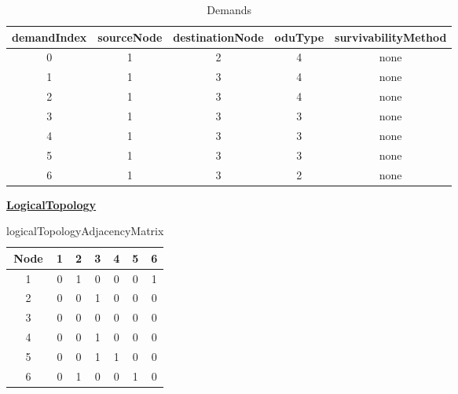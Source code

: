 \begin{table}[H]
	\centering
	\begin{tabular}{| c | c | c | c | c |}
		\hline
		\textbf{demandIndex} & \textbf{sourceNode} & \textbf{destinationNode} & \textbf{oduType} & \textbf{survivabilityMethod}\\ \hline
		0                    & 1                   & 2                        & 4                & none						   \\ \hline
		1                    & 1                   & 3                        & 4                & none                        \\ \hline
		2                    & 1                   & 3                        & 4                & none                        \\ \hline
		3                    & 1                   & 3                        & 3                & none                        \\ \hline
		4                    & 1                   & 3                        & 3                & none                        \\ \hline
		5                    & 1                   & 3                        & 3                & none                        \\ \hline
		6                    & 1                   & 3                        & 2                & none                        \\ \hline
	\end{tabular}
	\caption{Demands}
	\label{demands}
\end{table}

\underline{\textbf{LogicalTopology}}

\begin{table}[H]
	\centering
	\begin{tabular}{| c | c | c | c | c | c | c |}
		\hline
		\textbf{Node} & 1 & 2 & 3 & 4 & 5 & 6 \\ \hline
		1             & 0 & 1 & 0 & 0 & 0 & 1 \\ \hline
		2             & 0 & 0 & 1 & 0 & 0 & 0 \\ \hline
		3             & 0 & 0 & 0 & 0 & 0 & 0 \\ \hline
		4			  & 0 & 0 & 1 & 0 & 0 & 0 \\ \hline	
		5    	      & 0 & 0 & 1 & 1 & 0 & 0 \\ \hline
		6			  & 0 & 1 & 0 & 0 & 1 & 0 \\ \hline
	\end{tabular}
	\caption{logicalTopologyAdjacencyMatrix}
	\label{logical_matrix}
\end{table}

